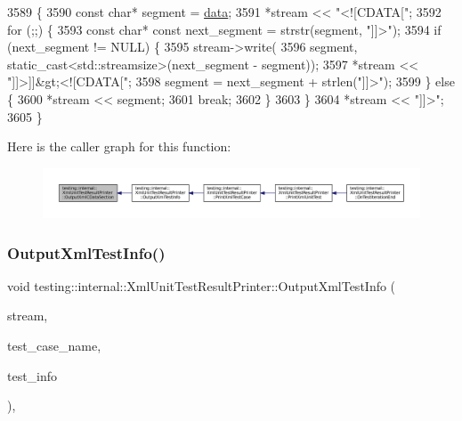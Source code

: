 \begin{DoxyCode}
3589                                                                        \{
3590   \textcolor{keyword}{const} \textcolor{keywordtype}{char}* segment = \hyperlink{namespacekeyboard__server__node_abfec01745fb17e2aa813913bea03d707}{data};
3591   *stream << \textcolor{stringliteral}{"<![CDATA["};
3592   \textcolor{keywordflow}{for} (;;) \{
3593     \textcolor{keyword}{const} \textcolor{keywordtype}{char}* \textcolor{keyword}{const} next\_segment = strstr(segment, \textcolor{stringliteral}{"]]>"});
3594     \textcolor{keywordflow}{if} (next\_segment != NULL) \{
3595       stream->write(
3596           segment, static\_cast<std::streamsize>(next\_segment - segment));
3597       *stream << \textcolor{stringliteral}{"]]>]]&gt;<![CDATA["};
3598       segment = next\_segment + strlen(\textcolor{stringliteral}{"]]>"});
3599     \} \textcolor{keywordflow}{else} \{
3600       *stream << segment;
3601       \textcolor{keywordflow}{break};
3602     \}
3603   \}
3604   *stream << \textcolor{stringliteral}{"]]>"};
3605 \}
\end{DoxyCode}
Here is the caller graph for this function\+:
\nopagebreak
\begin{figure}[H]
\begin{center}
\leavevmode
\includegraphics[width=350pt]{classtesting_1_1internal_1_1XmlUnitTestResultPrinter_a41bccd75f54932c5b3b8cce1f94dbd54_icgraph}
\end{center}
\end{figure}
\mbox{\label{classtesting_1_1internal_1_1XmlUnitTestResultPrinter_af642843faed4cd28c77d688f6f2820d7}} 
\subsubsection{\texorpdfstring{Output\+Xml\+Test\+Info()}{OutputXmlTestInfo()}}
{\footnotesize\ttfamily void testing\+::internal\+::\+Xml\+Unit\+Test\+Result\+Printer\+::\+Output\+Xml\+Test\+Info (\begin{DoxyParamCaption}\item[{\+::std\+::ostream $\ast$}]{stream,  }\item[{const char $\ast$}]{test\+\_\+case\+\_\+name,  }\item[{const \hyperlink{classtesting_1_1TestInfo}{Test\+Info} \&}]{test\+\_\+info }\end{DoxyParamCaption})\hspace{0.3cm}{\ttfamily [static]}, {\ttfamily [private]}}



